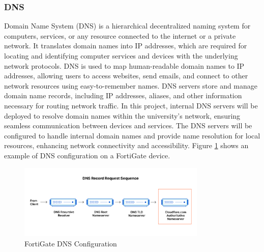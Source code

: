 \documentclass[12pt]{report}
\begin{document}
\subsubsection{DNS}
Domain Name System (DNS) is a hierarchical decentralized naming system for computers, services, or any resource connected to the internet or a private network. It translates domain names into IP addresses, which are required for locating and identifying computer services and devices with the underlying network protocols. DNS is used to map human-readable domain names to IP addresses, allowing users to access websites, send emails, and connect to other network resources using easy-to-remember names. DNS servers store and manage domain name records, including IP addresses, aliases, and other information necessary for routing network traffic. In this project, internal DNS servers will be deployed to resolve domain names within the university's network, ensuring seamless communication between devices and services. The DNS servers will be configured to handle internal domain names and provide name resolution for local resources, enhancing network connectivity and accessibility. \cite{DNS}
Figure \ref{fig:DNS} shows an example of DNS configuration on a FortiGate device.
\begin{figure}[h]
    \centering
    \includegraphics[width=0.8\textwidth]{images/dns.png}
    \caption{FortiGate DNS Configuration \cite{DNSIMG}}
    \label{fig:DNS}
\end{figure}
\end{document}
